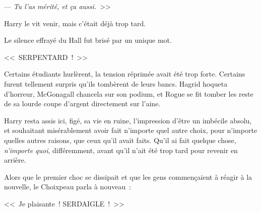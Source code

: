 --- \emph{Tu l'as mérité, et ça aussi.}~>>

Harry le vit venir, mais c'était déjà trop tard.

Le silence effrayé du Hall fut brisé par un unique mot.

<<~SERPENTARD~!~>>

Certains étudiants hurlèrent, la tension réprimée avait été trop forte. Certains furent tellement surpris qu'ils tombèrent de leurs bancs. Hagrid hoqueta d'horreur, McGonagall chancela sur son podium, et Rogue se fit tomber les reste de sa lourde coupe d'argent directement sur l'aine.

Harry resta assis ici, figé, sa vie en ruine, l'impression d'être un imbécile absolu, et souhaitant misérablement avoir fait n'importe quel autre choix, pour n'importe quelles autres raisons, que ceux qu'il avait faits. Qu'il ai fait quelque chose, \emph{n'importe quoi}, différemment, avant qu'il n'ait été trop tard pour revenir en arrière.

Alors que le premier choc se dissipait et que les gens commençaient à réagir à la nouvelle, le Choixpeau parla à nouveau~:

<<~Je plaisante~! SERDAIGLE~!~>> 


